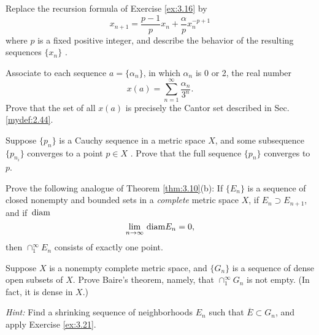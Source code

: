 \begin{myExercise}
    \label{ex:3.18}
    Replace the recursion formula of Exercise \ref{ex:3.16} by 
    \begin{equation*}
        x_{n+1} = \frac{p-1}{p}x_n + \frac{\alpha}{p}x_n^{-p+1}
    \end{equation*}
    where $p$ is a fixed positive integer, and describe the behavior of the resulting sequences $\{x_n\}$ .
\end{myExercise}

\begin{myExercise}
    \label{ex:3.19}
    Associate to each sequence $a = \{\alpha_n\}$, 
    in which $\alpha_n$ is 0 or 2,
    the real number 
    \begin{equation*}
        x(a) = \sum_{n=1}^{\infty} \frac{\alpha_n}{3^n} .
    \end{equation*}
    Prove that the set of all $x(a)$ is precisely the Cantor set described in Sec. \ref{mydef:2.44}.
\end{myExercise}


\begin{myExercise}
    \label{ex:3.20}
    Suppose $\{p_n\}$ is a Cauchy sequence in a metric space $X$,
    and some subsequence $\{p_{n_i}\}$ converges to a point $p \in X$ .
    Prove that the full sequence $\{p_n\}$ converges to $p$.
\end{myExercise}


\begin{myExercise}
    \label{ex:3.21}
    Prove the following analogue of Theorem \ref{thm:3.10}(b): 
    If $\{E_n\}$ is a sequence of closed nonempty and bounded sets in a \emph{complete} metric space $X$, 
    if $E_n \supset E_{n+1}$, and if $\protect\mathop{}\mathrm{diam}$
    \begin{equation*}
        \lim_{n \to \infty} \protect\mathop{}\mathrm{diam} E_n = 0 ,
    \end{equation*}
    then $\cap_1^{\infty} E_n$ consists of exactly one point.
\end{myExercise}


\begin{myExercise}
    \label{ex:3.22}
    Suppose $X$ is a nonempty complete metric space, 
    and $\{G_n\}$ is a sequence of dense open subsets of $X$. 
    Prove Baire's theorem, namely, that $\cap_1^{\infty} G_n$ is not
    empty. 
    (In fact, it is dense in $X$.) 
    
    \emph{Hint:} Find a shrinking sequence of neighborhoods $E_n$ such that 
    $\overline{E} \subset G_n$, and apply Exercise \ref{ex:3.21}.
\end{myExercise}


